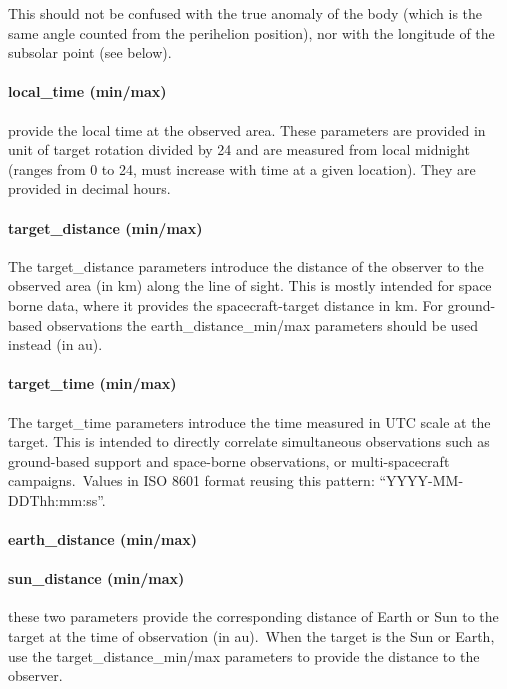 \documentclass[11pt,a4paper]{ivoa}
\begin{document}
This should not be confused with the true anomaly of the body (which is the same angle counted from the perihelion position), nor with the longitude of the subsolar point (see below).

\paragraph{local\_time (min/max)}

provide the local time at the observed area. These parameters are provided in unit of target rotation divided by 24 and are measured from local midnight (ranges from 0 to 24, must increase with time at a given location). They are provided in decimal hours.

\paragraph{target\_distance (min/max)}

The target\_distance parameters introduce the distance of the observer to the observed area (in km) along the line of sight. This is mostly intended for space borne data, where it provides the spacecraft-target distance in km. For ground-based observations the earth\_distance\_min/max parameters should be used instead (in au).

\paragraph{target\_time (min/max)}

The target\_time parameters introduce the time measured in UTC scale at the target. This is intended to directly correlate simultaneous observations such as ground-based support and space-borne observations, or multi-spacecraft campaigns. Values in ISO 8601 format reusing this pattern: “YYYY-MM-DDThh:mm:ss”. 

\paragraph{earth\_distance (min/max)}

\paragraph{sun\_distance (min/max)}

these two parameters provide the corresponding distance of Earth or Sun to the target at the time of observation (in au). When the target is the Sun or Earth, use the target\_distance\_min/max parameters to provide the distance to the observer.
\end{document}
